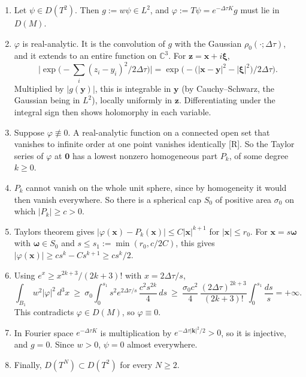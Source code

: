 \documentclass[11pt,a4paper]{article}
\providecommand{\tightlist}{\setlength{\itemsep}{0pt}\setlength{\parskip}{0pt}}
\begin{document}
\begin{enumerate}
\def\labelenumi{\arabic{enumi}.}
\tightlist
\item
  Let \(\psi\in D(T^2)\). Then \(g:=w\psi\in L^2\), and \(\varphi:=T\psi=e^{-\Delta\tau K}g\) must lie in \(D(M)\).
\item
  \(\varphi\) is real-analytic. It is the convolution of \(g\) with the Gaussian \(\rho_0(\cdot;\Delta\tau)\), and it extends to an entire function on \(\mathbb C^3\). For \(\mathbf z=\mathbf x+i\boldsymbol\xi\),
  \[
\Big|\exp\Big(-\sum_i(z_i-y_i)^2/2\Delta\tau\Big)\Big|=\exp\Big(-\big(|\mathbf x-\mathbf y|^2-|\boldsymbol\xi|^2\big)/2\Delta\tau\Big).
\]
  Multiplied by \(|g(\mathbf y)|\), this is integrable in \(\mathbf y\) (by Cauchy--Schwarz, the Gaussian being in \(L^2\)), locally uniformly in \(\mathbf z\). Differentiating under the integral sign then shows holomorphy in each variable.
\item
  Suppose \(\varphi\not\equiv0\). A real-analytic function on a connected open set that vanishes to infinite order at one point vanishes identically {[}R{]}. So the Taylor series of \(\varphi\) at \(\mathbf 0\) has a lowest nonzero homogeneous part \(P_k\), of some degree \(k\ge0\).
\item
  \(P_k\) cannot vanish on the whole unit sphere, since by homogeneity it would then vanish everywhere. So there is a spherical cap \(S_0\) of positive area \(\sigma_0\) on which \(|P_k|\ge c>0\).
\item
  Taylor\textquotesingle s theorem gives \(|\varphi(\mathbf x)-P_k(\mathbf x)|\le C|\mathbf x|^{k+1}\) for \(|\mathbf x|\le r_0\). For \(\mathbf x=s\boldsymbol\omega\) with \(\boldsymbol\omega\in S_0\) and \(s\le s_1:=\min(r_0,c/2C)\), this gives \(|\varphi(\mathbf x)|\ge cs^k-Cs^{k+1}\ge cs^k/2\).
\item
  Using \(e^x\ge x^{2k+3}/(2k+3)!\) with \(x=2\Delta\tau/s\),
  \[
\int_{B_1}w^2|\varphi|^2\,d^3x\ \ge\ \sigma_0\int_0^{s_1}s^2e^{2\Delta\tau/s}\,\frac{c^2s^{2k}}{4}\,ds\ \ge\ \frac{\sigma_0c^2}{4}\,\frac{(2\Delta\tau)^{2k+3}}{(2k+3)!}\int_0^{s_1}\frac{ds}{s}=+\infty .
\]
  This contradicts \(\varphi\in D(M)\), so \(\varphi\equiv0\).
\item
  In Fourier space \(e^{-\Delta\tau K}\) is multiplication by \(e^{-\Delta\tau|\mathbf k|^2/2}>0\), so it is injective, and \(g=0\). Since \(w>0\), \(\psi=0\) almost everywhere.
\item
  Finally, \(D(T^N)\subset D(T^2)\) for every \(N\ge2\).
\end{enumerate}
\end{document}
